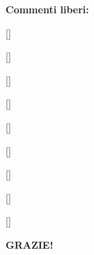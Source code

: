 \hrulefill

\textbf{Commenti liberi:}

[\dotfill]

[\dotfill]

[\dotfill]

[\dotfill]

[\dotfill]

[\dotfill]

[\dotfill]

[\dotfill]

[\dotfill]

\hrulefill

\textbf{GRAZIE!}